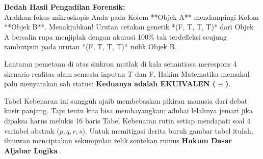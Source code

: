 \textbf{Bedah Hasil Pengadilan Forensik:} \\
Arahkan fokus mikroskopis Anda pada Kolom **Objek A** mendampingi Kolom **Objek B**. Menakjubkan! Urutan cetakan genetik *(F, T, T, T)* dari Objek A bersalin rupa menjiplak dengan akurasi 100\% tak terdefleksi seujung rambutpun pada urutan *(F, T, T, T)* milik Objek B.

Lantaran pemetaan di atas sinkron mutlak di kala senantiasa merespons 4 skenario realitas alam semesta inputan T dan F, Hakim Matematika memukul palu menyatakan sah status: \textbf{Keduanya adalah EKUIVALEN ($\equiv$)}. 

Tabel Kebenaran ini sungguh ajaib membebaskan pikiran manusia dari debat kusir panjang. Tapi tentu kita bisa membayangkan; aduhai lelahnya jemari jika dipaksa harus melukis 16 baris Tabel Kebenaran rutin setiap mendapati soal 4 variabel abstrak ($p, q, r, s$). Untuk memitigasi derita buruh gambar tabel itulah, ilmuwan menciptakan sekumpulan relik sontekan rumus \textbf{Hukum Dasar Aljabar Logika} \cite{wiki_first_order_logic}.
